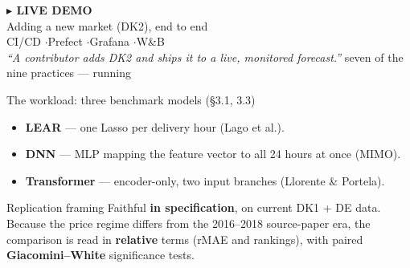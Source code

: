 \documentclass[aspectratio=169,10pt]{beamer}
\begin{document}
{%
\begin{frame}[plain]
  \color{white}\centering
  \vfill
  {\Huge\bfseries $\blacktriangleright$\; LIVE DEMO}\\[10pt]
  {\large Adding a new market (DK2), end to end}\\[14pt]
  {\normalsize CI/CD \quad$\cdot$\quad Prefect \quad$\cdot$\quad Grafana \quad$\cdot$\quad W\&B}\\[16pt]
  {\small\itshape ``A contributor adds DK2 and ships it to a live, monitored forecast.''}
  \vfill
  {\footnotesize seven of the nine practices --- running}
  \vfill
\end{frame}
}


\begin{frame}{The workload: three benchmark models \hfill\small(\S3.1, 3.3)}
  \begin{itemize}\small
    \item \textbf{LEAR} --- one Lasso per delivery hour (Lago et al.).
    \item \textbf{DNN} --- MLP mapping the feature vector to all 24 hours at once (MIMO).
    \item \textbf{Transformer} --- encoder-only, two input branches (Llorente \& Portela).
  \end{itemize}
  \vfill
  \begin{block}{Replication framing}
    Faithful \textbf{in specification}, on current DK1 + DE data. Because the price regime
    differs from the 2016--2018 source-paper era, the comparison is read in \textbf{relative}
    terms (rMAE and rankings), with paired \textbf{Giacomini--White} significance tests.
  \end{block}
\end{frame}
\end{document}
